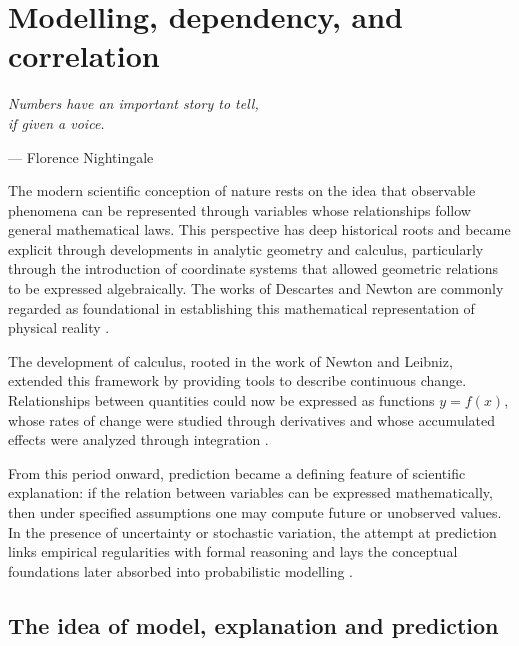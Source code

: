\chapter{Modelling, dependency, and correlation}
\label{chapter5}

\epigraph{\textit{Numbers have an important story to tell,\\if given a voice.}}{— Florence Nightingale}

The modern scientific conception of nature rests on the idea that observable phenomena can be represented through variables whose relationships follow general mathematical laws. This perspective has deep historical roots and became explicit through developments in analytic geometry and calculus, particularly through the introduction of coordinate systems that allowed geometric relations to be expressed algebraically. The works of Descartes and Newton are commonly regarded as foundational in establishing this mathematical representation of physical reality \cite{descartes_1637_geometry,newton_1687_principia}. 

\medskip

The development of calculus, rooted in the work of Newton and Leibniz, extended this framework by providing tools to describe continuous change. Relationships between quantities could now be expressed as functions \( y = f(x) \), whose rates of change were studied through derivatives and whose accumulated effects were analyzed through integration \cite{leibniz_1684_nova,cauchy_1821_analyse}. 

\medskip

From this period onward, prediction became a defining feature of scientific explanation: if the relation between variables can be expressed mathematically, then under specified assumptions one may compute future or unobserved values. In the presence of uncertainty or stochastic variation, the attempt at prediction links empirical regularities with formal reasoning and lays the conceptual foundations later absorbed into probabilistic modelling \cite{reichenbach_1938_prediction,cox_2006_principles}. 

\section{The idea of model, explanation and prediction}


